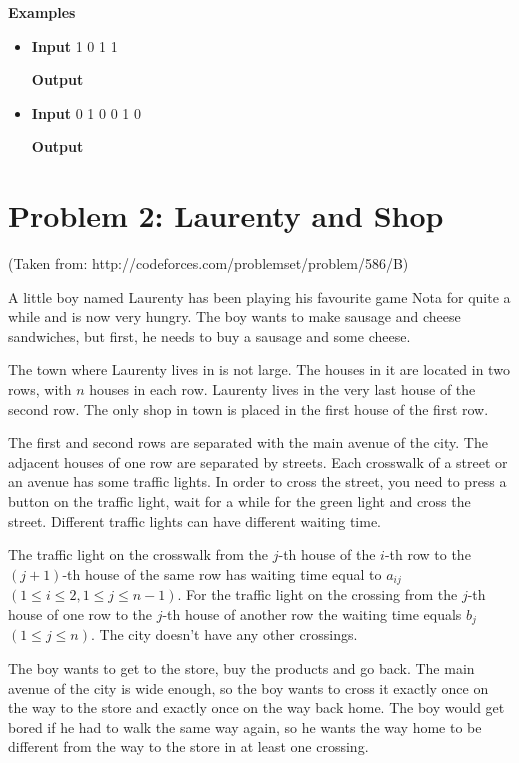 \normalfont\documentclass[letterpaper,11pt]{article}
\begin{document}
\textbf{Examples}
\begin{itemize}
\item \textbf{Input}   1 0 1 1

\textbf{Output} 

\item \textbf{Input}   0 1 0 0 1 0

\textbf{Output} 
\end{itemize}

\newpage

\section*{Problem 2: Laurenty and Shop}
(Taken from: http://codeforces.com/problemset/problem/586/B)

A little boy named Laurenty has been playing his favourite game Nota for quite a while and is now very hungry. The boy wants to make sausage and cheese sandwiches, but first, he needs to buy a sausage and some cheese.

The town where Laurenty lives in is not large. The houses in it are located in two rows, with $n$ houses in each row. Laurenty lives in the very last house of the second row. The only shop in town is placed in the first house of the first row.

The first and second rows are separated with the main avenue of the city. The adjacent houses of one row are separated by streets. Each crosswalk of a street or an avenue has some traffic lights. In order to cross the street, you need to press a button on the traffic light, wait for a while for the green light and cross the street. Different traffic lights can have different waiting time.

The traffic light on the crosswalk from the $j$-th house of the $i$-th row to the $(j + 1)$-th house of the same row has waiting time equal to $a_{ij}$ $(1 \leq i \leq 2, 1 \leq j \leq n - 1)$. For the traffic light on the crossing from the $j$-th house of one row to the $j$-th house of another row the waiting time equals $b_j$ $(1 \leq j \leq n)$. The city doesn't have any other crossings.

The boy wants to get to the store, buy the products and go back. The main avenue of the city is wide enough, so the boy wants to cross it exactly once on the way to the store and exactly once on the way back home. The boy would get bored if he had to walk the same way again, so he wants the way home to be different from the way to the store in at least one crossing.
\end{document}
